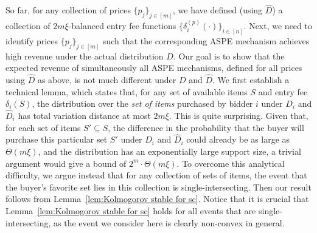 {So far, for any collection of prices $\{p_j\}_{j\in[m]}$, we have defined (using $\hat{D}$) a collection of $2m\xi$-balanced entry fee functions $\{\delta_i^{(p)}(\cdot)\}_{i\in[n]}$. Next, we need to identify prices $\{p_j\}_{j\in[m]}$ such that the corresponding ASPE mechanism achieves high revenue under the actual distribution $D$. Our goal is to show that the expected revenue of simultaneously all ASPE mechanisms, defined for all prices using $\hat{D}$ as above, is not much different under $D$ and $\hat{D}$. We first establish a technical lemma, which states that, for any set of available items $S$ and entry fee $\delta_i(S)$, the distribution over the {\em set of items} purchased by bidder $i$ under $D_i$ and $\hat{D}_i$ has total variation distance at most $2m\xi$. This is quite surprising. Given that, for each set of items $S' \subseteq S$, the difference in the probability that the buyer will purchase this particular set $S'$ under $D_i$ and $\hat{D}_i$ could already be as large as {$\Theta(m\xi)$}, and the distribution has an exponentially large support size,  a trivial argument would give a bound of {$2^m\cdot \Theta(m\xi)$}. To overcome this analytical difficulty, we argue instead that for any collection of sets of items, the event that the buyer's favorite set lies in this collection is single-intersecting. Then our result follows from Lemma~\ref{lem:Kolmogorov stable for sc}. Notice that it is crucial that Lemma~\ref{lem:Kolmogorov stable for sc} holds for all events that are single-intersecting, as the event we consider here is clearly non-convex in general. 

}
